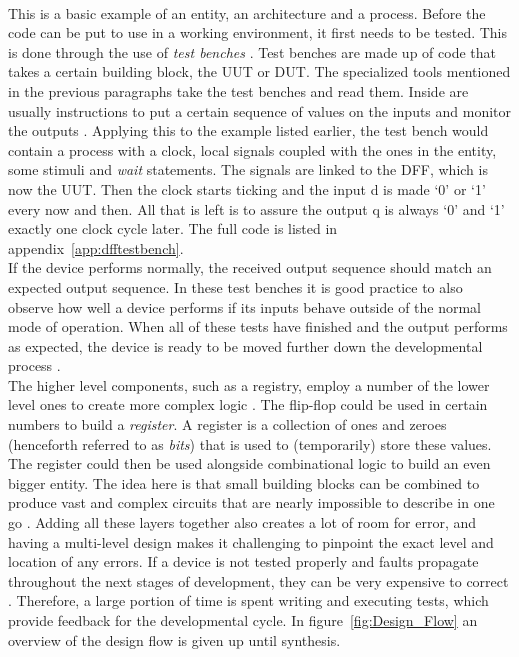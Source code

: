 \documentclass[11pt,british]{article}
\begin{document}
\\[\baselineskip]
This is a basic example of an entity, an architecture and a process. Before the code can be put to use in a working environment, it first needs to be tested. This is done through the use of \emph{test benches} \cite{bergeron00}. Test benches are made up of code that takes a certain building block, the \gls{UUT} or \gls{DUT}. The specialized tools mentioned in the previous paragraphs take the test benches and read them. Inside are usually instructions to put a certain sequence of values on the inputs and monitor the outputs \cite{vhdltestbench}. Applying this to the example listed earlier, the test bench would contain a process with a clock, local signals coupled with the ones in the entity, some stimuli and \emph{wait} statements. The signals are linked to the DFF, which is now the UUT. Then the clock starts ticking and the input d is made `0' or `1' every now and then. All that is left is to assure the output q is always `0' and `1' exactly one clock cycle later. The full code is listed in appendix~\ref{app:dfftestbench}.
\\[\baselineskip]
If the device performs normally, the received output sequence should match an expected output sequence. In these test benches it is good practice to also observe how well a device performs if its inputs behave outside of the normal mode of operation. When all of these tests have finished and the output performs as expected, the device is ready to be moved further down the developmental process \cite{vhdldebug}.
\\[\baselineskip]
The higher level components, such as a registry, employ a number of the lower level ones to create more complex logic \cite{vhdlsynth3}. The flip-flop could be used in certain numbers to build a \emph{register}. A register is a collection of ones and zeroes (henceforth referred to as \emph{bits}) that is used to (temporarily) store these values. The register could then be used alongside combinational logic to build an even bigger entity. The idea here is that small building blocks can be combined to produce vast and complex circuits that are nearly impossible to describe in one go \cite{vhdlhierarchy}. Adding all these layers together also creates a lot of room for error, and having a multi-level design makes it challenging to pinpoint the exact level and location of any errors. If a device is not tested properly and faults propagate throughout the next stages of development, they can be very expensive to correct \cite{weber06}. Therefore, a large portion of time is spent writing and executing tests, which provide feedback for the developmental cycle. In figure~\ref{fig:Design_Flow} an overview of the design flow is given up until synthesis.
\end{document}
